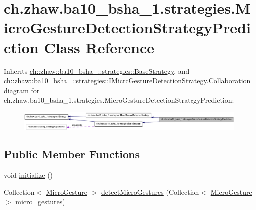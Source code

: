 \hypertarget{classch_1_1zhaw_1_1ba10__bsha__1_1_1strategies_1_1MicroGestureDetectionStrategyPrediction}{
\section{ch.zhaw.ba10\_\-bsha\_\-1.strategies.MicroGestureDetectionStrategyPrediction Class Reference}
\label{classch_1_1zhaw_1_1ba10__bsha__1_1_1strategies_1_1MicroGestureDetectionStrategyPrediction}
}


Inherits \hyperlink{classch_1_1zhaw_1_1ba10__bsha__1_1_1strategies_1_1BaseStrategy}{ch::zhaw::ba10\_\-bsha\_::strategies::BaseStrategy}, and \hyperlink{interfacech_1_1zhaw_1_1ba10__bsha__1_1_1strategies_1_1IMicroGestureDetectionStrategy}{ch::zhaw::ba10\_\-bsha\_::strategies::IMicroGestureDetectionStrategy}.Collaboration diagram for ch.zhaw.ba10\_\-bsha\_\-1.strategies.MicroGestureDetectionStrategyPrediction:\nopagebreak
\begin{figure}[H]
\begin{center}
\leavevmode
\includegraphics[width=400pt]{classch_1_1zhaw_1_1ba10__bsha__1_1_1strategies_1_1MicroGestureDetectionStrategyPrediction__coll__graph}
\end{center}
\end{figure}
\subsection*{Public Member Functions}
\begin{DoxyCompactItemize}
\item 
void \hyperlink{classch_1_1zhaw_1_1ba10__bsha__1_1_1strategies_1_1MicroGestureDetectionStrategyPrediction_ae0261f02e4d7596c9fff8322c78fa012}{initialize} ()
\item 
Collection$<$ \hyperlink{classch_1_1zhaw_1_1ba10__bsha__1_1_1service_1_1MicroGesture}{MicroGesture} $>$ \hyperlink{classch_1_1zhaw_1_1ba10__bsha__1_1_1strategies_1_1MicroGestureDetectionStrategyPrediction_af8639be36ae7218b7f7d2feee8edc86f}{detectMicroGestures} (Collection$<$ \hyperlink{classch_1_1zhaw_1_1ba10__bsha__1_1_1service_1_1MicroGesture}{MicroGesture} $>$ micro\_\-gestures)
\end{DoxyCompactItemize}
